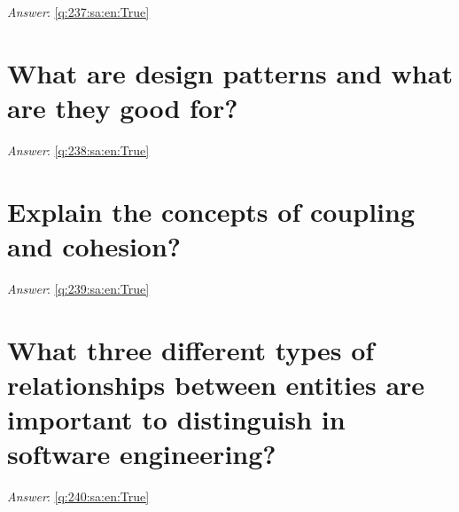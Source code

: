 \documentclass[a4paper,11pt,oneside]{book}
\begin{document}
\begin{sloppypar}
\label{q:237:sa:en:False}

\vspace{2cm}

\noindent\makebox[\textwidth]{\hrulefill}

\vspace{1cm}

\textit{Answer}: \autoref{q:237:sa:en:True}



\section{What are design patterns and what are they good for?}

\label{q:238:sa:en:False}

\vspace{2cm}

\noindent\makebox[\textwidth]{\hrulefill}

\vspace{1cm}

\textit{Answer}: \autoref{q:238:sa:en:True}



\section{Explain the concepts of coupling and cohesion?}

\label{q:239:sa:en:False}

\vspace{2cm}

\noindent\makebox[\textwidth]{\hrulefill}

\vspace{1cm}

\textit{Answer}: \autoref{q:239:sa:en:True}



\section{What three different types of relationships between entities are important to distinguish in software engineering?}

\label{q:240:sa:en:False}

\vspace{2cm}

\noindent\makebox[\textwidth]{\hrulefill}

\vspace{1cm}

\textit{Answer}: \autoref{q:240:sa:en:True}




\end{sloppypar}
\end{document}
